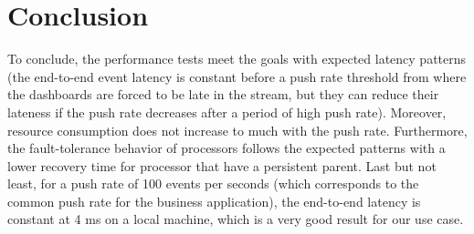 \section{Conclusion}

To conclude, the performance tests meet the goals with expected latency patterns (the end-to-end event latency is constant before a push rate threshold from where the dashboards are forced to be late in the stream, but they can reduce their lateness if the push rate decreases after a period of high push rate). Moreover, resource consumption does not increase to much with the push rate. Furthermore, the fault-tolerance behavior of processors follows the expected patterns with a lower recovery time for processor that have a persistent parent.
Last but not least, for a push rate of 100 events per seconds (which corresponds to the common push rate for the business application), the end-to-end latency is constant at 4 ms on a local machine, which is a very good result for our use case.







